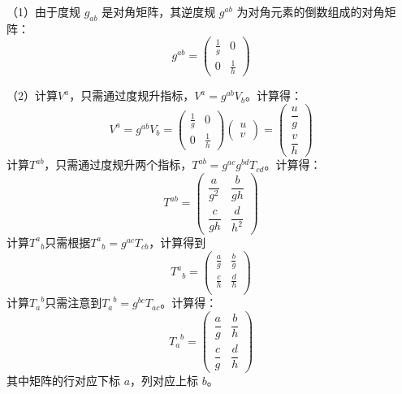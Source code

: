 
\begin{solution}
	（1）由于度规 \( g_{ab} \) 是对角矩阵，其逆度规 \( g^{ab} \) 为对角元素的倒数组成的对角矩阵：
	\[g^{ab} = \begin{pmatrix} \frac{1}{g} & 0 \\ 0 & \frac{1}{h} \end{pmatrix}\]
	
	（2）计算\( V^a \)，只需通过度规升指标，\( V^a = g^{ab} V_b \)。计算得：
	\[V^a = g^{ab} V_b = \begin{pmatrix} \frac{1}{g} & 0 \\ 0 & \frac{1}{h} \end{pmatrix} \begin{pmatrix} u \\ v \end{pmatrix} = \begin{pmatrix} \dfrac{u}{g} \\[1em] \dfrac{v}{h} \end{pmatrix}\]
		计算\( T^{ab} \)，只需通过度规升两个指标，\( T^{ab} = g^{ac} g^{bd} T_{cd} \)。计算得：
		\[T^{ab} = \begin{pmatrix} \dfrac{a}{g^2} & \dfrac{b}{g h} \\[1em] \dfrac{c}{g h} & \dfrac{d}{h^2} \end{pmatrix}\]
		计算\({T^a}_b\)只需根据\({T^a}_b=g^{ac}T_{cb}\)，计算得到
		\[{T^a}_b=\begin{pmatrix}  \frac{a}{g} & \frac{b}{g} \\[1em] \frac{c}{h} & \frac{d}{h} \\ \end{pmatrix}\]
		计算\( {T_a}^b \)只需注意到\( {T_a}^{b} = g^{bc} T_{ac} \)。计算得：
		\[{T_a}^{b} = \begin{pmatrix} \dfrac{a}{g} & \dfrac{b}{h} \\[1em] \dfrac{c}{g} & \dfrac{d}{h} \end{pmatrix}\]
		其中矩阵的行对应下标 \( a \)，列对应上标 \( b \)。
		

\end{solution}
